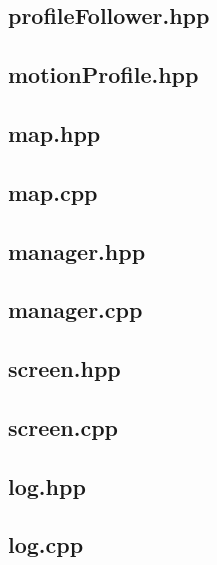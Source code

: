 \subsection{profileFollower.hpp}

\subsection{motionProfile.hpp}

\subsection{map.hpp}

\subsection{map.cpp}

\subsection{manager.hpp}

\subsection{manager.cpp}

\subsection{screen.hpp}

\subsection{screen.cpp}

\subsection{log.hpp}

\subsection{log.cpp}

